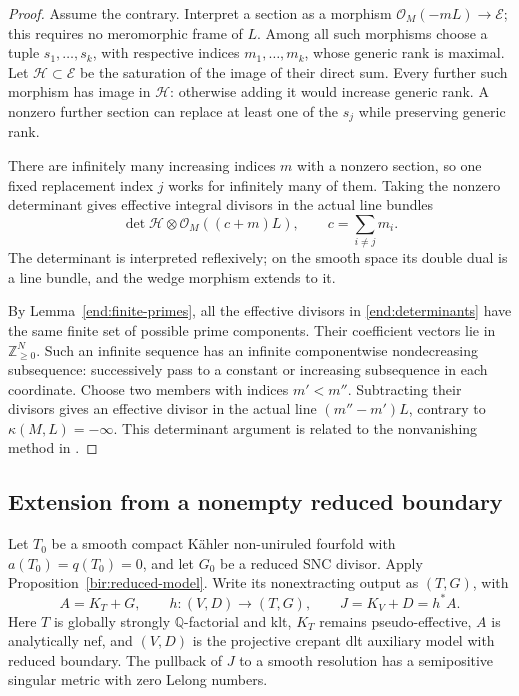 \documentclass[11pt,letterpaper]{article}
\theoremstyle{definition}
\theoremstyle{remark}
\begin{document}
\begin{proof}
Assume the contrary. Interpret a section as a morphism
\(\mathcal{O}_M(-mL)\to\mathcal E\); this requires no meromorphic frame
of \(L\). Among all such morphisms choose a tuple
\(s_1,\ldots,s_k\), with respective indices \(m_1,\ldots,m_k\),
whose generic rank is maximal. Let \(\mathcal H\subset\mathcal E\)
be the saturation of the image of their direct sum. Every further
such morphism has image in \(\mathcal H\): otherwise adding it
would increase generic rank. A nonzero further section can replace
at least one of the \(s_j\) while preserving generic rank.

There are infinitely many increasing indices \(m\) with a nonzero
section, so one fixed replacement index \(j\) works for infinitely
many of them. Taking the nonzero determinant gives effective integral
divisors in the actual line bundles
\begin{equation}\label{end:determinants}
 \det\mathcal H\otimes\mathcal{O}_M((c+m)L),
 \qquad c=\sum_{i\ne j}m_i.
\end{equation}
The determinant is interpreted reflexively; on the smooth space its
double dual is a line bundle, and the wedge morphism extends to it.

By Lemma~\ref{end:finite-primes}, all the effective divisors in
\eqref{end:determinants} have the same finite set of possible prime
components. Their coefficient vectors lie in \(\mathbb{Z}_{\ge0}^{N}\).
Such an infinite sequence has an infinite componentwise
nondecreasing subsequence: successively pass to a constant or
increasing subsequence in each coordinate. Choose two members with
indices \(m'<m''\). Subtracting their divisors gives an effective
divisor in the actual line \((m''-m')L\), contrary to
\(\kappa(M,L)=-\infty\). This determinant argument is related to
the nonvanishing method in \cite{HLLNonvanishing}.
\end{proof}

\subsection{Extension from a nonempty reduced boundary}

Let \(T_0\) be a smooth compact K\"ahler non-uniruled fourfold
with \(a(T_0)=q(T_0)=0\), and let \(G_0\) be a reduced SNC
divisor. Apply Proposition~\ref{bir:reduced-model}. Write its
nonextracting output as \((T,G)\), with
\[
 A=K_T+G,
 \qquad h:(V,D)\longrightarrow(T,G),
 \qquad J=K_V+D=h^*A.
\]
Here \(T\) is globally strongly \(\mathbb{Q}\)-factorial and klt,
\(K_T\) remains pseudo-effective, \(A\) is analytically nef,
and \((V,D)\) is the projective crepant dlt auxiliary model with
reduced boundary. The pullback of \(J\) to a smooth resolution
has a semipositive singular metric with zero Lelong numbers.
\end{document}
